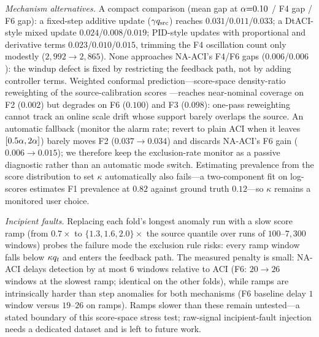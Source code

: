 \emph{Mechanism alternatives.} A compact comparison (mean gap at $\alpha{=}0.10$ / F4 gap / F6 gap): a fixed-step additive update ($\gamma q_{\mathrm{src}}$) reaches $0.031$/$0.011$/$0.033$; a DtACI-style mixed update $0.024$/$0.008$/$0.019$; PID-style updates with proportional and derivative terms $0.023$/$0.010$/$0.015$, trimming the F4 oscillation count only modestly ($2{,}992\to2{,}865$). None approaches NA-ACI's F4/F6 gaps ($0.006$/$0.006$): the windup defect is fixed by restricting the feedback path, not by adding controller terms. Weighted conformal prediction---score-space density-ratio reweighting of the source-calibration scores \cite{tibshirani2019}---reaches near-nominal coverage on F2 ($0.002$) but degrades on F6 ($0.100$) and F3 ($0.098$): one-pass reweighting cannot track an online scale drift whose support barely overlaps the source. An automatic fallback (monitor the alarm rate; revert to plain ACI when it leaves $[0.5\alpha,2\alpha]$) barely moves F2 ($0.037\!\to\!0.034$) and discards NA-ACI's F6 gain ($0.006\!\to\!0.015$); we therefore keep the exclusion-rate monitor as a passive diagnostic rather than an automatic mode switch. Estimating prevalence from the score distribution to set $\kappa$ automatically also fails---a two-component fit on log-scores estimates F1 prevalence at $0.82$ against ground truth $0.12$---so $\kappa$ remains a monitored user choice.

\emph{Incipient faults.} Replacing each fold's longest anomaly run with a slow score ramp (from $0.7\times$ to $\{1.3,1.6,2.0\}\times$ the source quantile over runs of $100$--$7{,}300$ windows) probes the failure mode the exclusion rule risks: every ramp window falls below $\kappa q_t$ and enters the feedback path. The measured penalty is small: NA-ACI delays detection by at most $6$ windows relative to ACI (F6: $20\!\to\!26$ windows at the slowest ramp; identical on the other folds), while ramps are intrinsically harder than step anomalies for both mechanisms (F6 baseline delay $1$ window versus $19$--$26$ on ramps). Ramps slower than these remain untested---a stated boundary of this score-space stress test; raw-signal incipient-fault injection needs a dedicated dataset and is left to future work.

